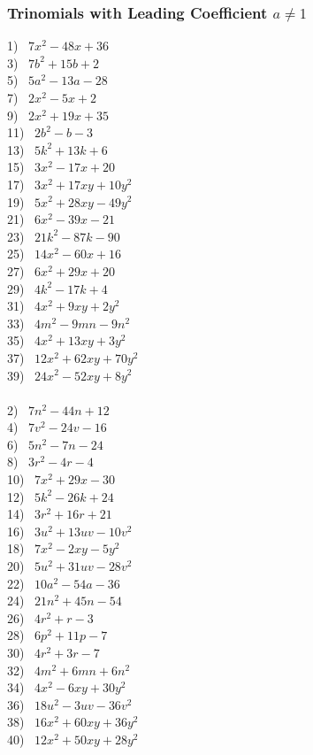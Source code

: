 \newpage

\subsubsection{Trinomials with Leading Coefficient $a\neq 1$}

{}
\label{aisnot1}
\begin{multicols}{2}
  1)~ $7 x^2 - 48 x + 36$\\
  3)~ $7 b^2 + 15 b + 2$\\
  5)~ $5 a^2 - 13 a - 28$\\
  7)~ $2 x^2 - 5 x + 2$\\
  9)~ $2 x^2 + 19 x + 35$\\
  11)~ $2 b^2 - b - 3$\\
  13)~ $5 k^2 + 13 k + 6$\\
  15)~ $3 x^2 - 17 x + 20$\\
  17)~ $3 x^2 + 17 x y + 10 y^2$\\
  19)~ $5 x^2 + 28 x y - 49 y^2$\\
  21)~ $6 x^2 - 39 x - 21$\\
  23)~ $21 k^2 - 87 k - 90$\\
  25)~ $14 x^2 - 60 x + 16$\\
  27)~ $6 x^2 + 29 x + 20$\\
  29)~ $4 k^2 - 17 k + 4$\\
  31)~ $4 x^2 + 9 x y + 2 y^2$\\
  33)~ $4 m^2 - 9 m n - 9 n^2$\\
  35)~ $4 x^2 + 13 x y + 3 y^2$\\
  37)~ $12 x^2 + 62 x y + 70 y^2$\\
  39)~ $24 x^2 - 52 x y + 8 y^2$\\
~\\
  2)~ $7 n^2 - 44 n + 12$\\
  4)~ $7 v^2 - 24 v - 16$\\
  6)~ $5 n^2 - 7 n - 24$\\
  8)~ $3 r^2 - 4 r - 4$\\
  10)~ $7 x^2 + 29 x - 30$\\
  12)~ $5 k^2 - 26 k + 24$\\
  14)~ $3 r^2 + 16 r + 21$\\
  16)~ $3 u^2 + 13 u v - 10 v^2$\\
  18)~ $7 x^2 - 2 x y - 5 y^2$\\
  20)~ $5 u^2 + 31 u v - 28 v^2$\\
  22)~ $10 a^2 - 54 a - 36$\\
  24)~ $21 n^2 + 45 n - 54$\\
  26)~ $4 r^2 + r - 3$\\
  28)~ $6 p^2 + 11 p - 7$\\
  30)~ $4 r^2 + 3 r - 7$\\
  32)~ $4 m^2 + 6 m n + 6 n^2$\\
  34)~ $4 x^2 - 6 x y + 30 y^2$\\
  36)~ $18 u^2 - 3 u v - 36 v^2$\\
  38)~ $16 x^2 + 60 x y + 36 y^2$\\
  40)~ $12 x^2 + 50 x y + 28 y^2$\\
\end{multicols}

